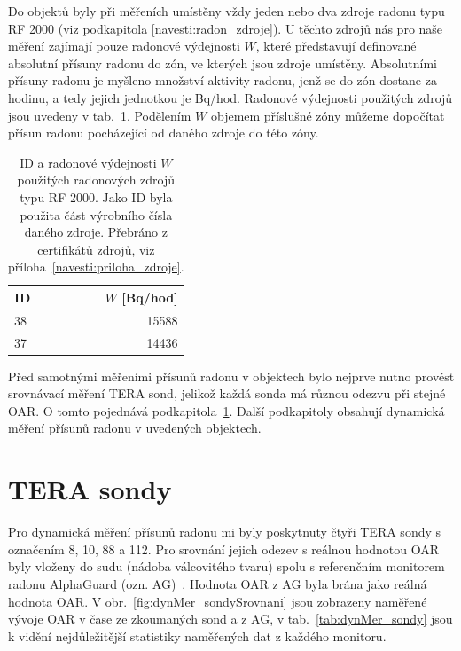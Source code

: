 Do objektů byly při měřeních umístěny vždy jeden nebo dva zdroje radonu typu RF 2000 (viz podkapitola \ref{navesti:radon_zdroje}). U těchto zdrojů nás pro naše měření zajímají pouze radonové výdejnosti $W$, které představují definované absolutní přísuny radonu do zón, ve kterých jsou zdroje umístěny. Absolutními přísuny radonu je myšleno množství aktivity radonu, jenž se do zón dostane za hodinu, a tedy jejich jednotkou je \si{Bq/hod}. Radonové výdejnosti použitých zdrojů jsou uvedeny v tab.~\ref{tab:dynMer_zdroje}. Podělením $W$ objemem příslušné zóny můžeme dopočítat přísun radonu pocházející od daného zdroje do této zóny. 
\begin{table}[ht]
    \centering
    \caption{ID a radonové výdejnosti $W$ použitých radonových zdrojů typu RF 2000. Jako ID byla použita část výrobního čísla daného zdroje. Přebráno z certifikátů zdrojů, viz příloha~\ref{navesti:priloha_zdroje}.}
    \label{tab:dynMer_zdroje}
    \begin{tabular}{lr}
        \toprule
        ID & $W$ [\si{Bq/hod}]\\
        \midrule
        38 & 15588\\
        37 & 14436\\
        \bottomrule
    \end{tabular}
\end{table}

Před samotnými měřeními přísunů radonu v objektech bylo nejprve nutno provést srovnávací měření TERA sond, jelikož každá sonda má různou odezvu při stejné OAR. O tomto pojednává podkapitola~\ref{navesti:dynMer_TERA}. Další podkapitoly obsahují dynamická měření přísunů radonu v uvedených objektech. 

\section{TERA sondy}\label{navesti:dynMer_TERA}

Pro dynamická měření přísunů radonu mi byly poskytnuty čtyři TERA sondy s označením 8, 10, 88 a 112. Pro srovnání jejich odezev s reálnou hodnotou OAR byly vloženy do sudu (nádoba válcovitého tvaru) spolu s referenčním monitorem radonu AlphaGuard (ozn. AG)~\cite{alphaguard}. Hodnota OAR z AG byla brána jako reálná hodnota OAR. V obr.~\ref{fig:dynMer_sondySrovnani} jsou zobrazeny naměřené vývoje OAR v čase ze zkoumaných sond a z AG, v tab.~\ref{tab:dynMer_sondy} jsou k vidění nejdůležitější statistiky naměřených dat z každého monitoru.

